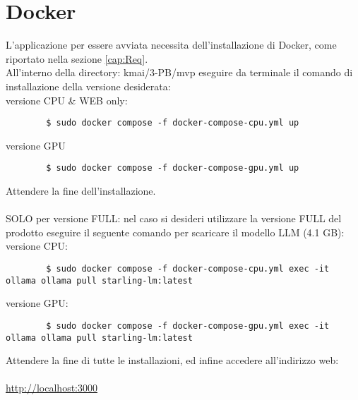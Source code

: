 \section{Docker}
L'applicazione per essere avviata necessita dell'installazione di Docker, come riportato nella sezione \ref{cap:Req}.\\
All'interno della directory: kmai/3-PB/mvp eseguire da terminale il comando di installazione della versione desiderata: \\
versione CPU \& WEB only:
    \begin{lstlisting}
        $ sudo docker compose -f docker-compose-cpu.yml up
    \end{lstlisting}
versione GPU
    \begin{lstlisting}
        $ sudo docker compose -f docker-compose-gpu.yml up
    \end{lstlisting}
Attendere la fine dell'installazione.\\\\
SOLO per versione FULL: nel caso si desideri utilizzare la versione FULL del prodotto eseguire il seguente comando per scaricare il modello LLM (4.1 GB):\\
versione CPU:
    \begin{lstlisting}
        $ sudo docker compose -f docker-compose-cpu.yml exec -it ollama ollama pull starling-lm:latest
    \end{lstlisting}
versione GPU:
    \begin{lstlisting}
        $ sudo docker compose -f docker-compose-gpu.yml exec -it ollama ollama pull starling-lm:latest
    \end{lstlisting}
Attendere la fine di tutte le installazioni, ed infine accedere all'indirizzo web: \\ \\
\url{http://localhost:3000}
